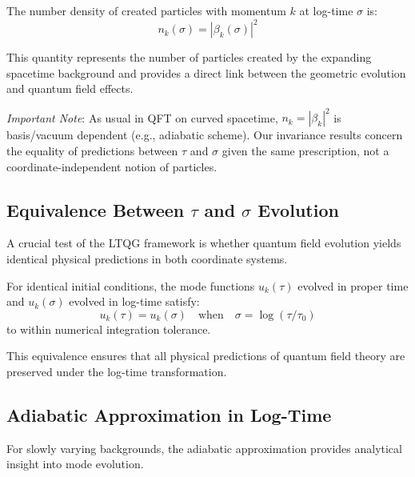 \begin{theorem}
\label{thm:particle_number}
The number density of created particles with momentum $k$ at log-time $\sigma$ is:
\begin{equation}
n_k(\sigma) = |\beta_k(\sigma)|^2
\label{eq:particle_number}
\end{equation}
\end{theorem}

This quantity represents the number of particles created by the expanding spacetime background and provides a direct link between the geometric evolution and quantum field effects.

\emph{Important Note}: As usual in QFT on curved spacetime, $n_k = |\beta_k|^2$ is basis/vacuum dependent (e.g., adiabatic scheme). Our invariance results concern the equality of predictions between $\tau$ and $\sigma$ given the same prescription, not a coordinate-independent notion of particles.

\subsection[Equivalence Between tau and sigma Evolution]{Equivalence Between $\tau$ and $\sigma$ Evolution}
\label{subsec:tau_sigma_equivalence}

A crucial test of the LTQG framework is whether quantum field evolution yields identical physical predictions in both coordinate systems.

\begin{theorem}
\label{thm:mode_evolution_equivalence}
For identical initial conditions, the mode functions $u_k(\tau)$ evolved in proper time and $u_k(\sigma)$ evolved in log-time satisfy:
\begin{equation}
u_k(\tau) = u_k(\sigma) \quad \text{when} \quad \sigma = \log(\tau/\tau_0)
\end{equation}
to within numerical integration tolerance.
\end{theorem}

This equivalence ensures that all physical predictions of quantum field theory are preserved under the log-time transformation.

\subsection{Adiabatic Approximation in Log-Time}
\label{subsec:adiabatic_approximation}

For slowly varying backgrounds, the adiabatic approximation provides analytical insight into mode evolution.

